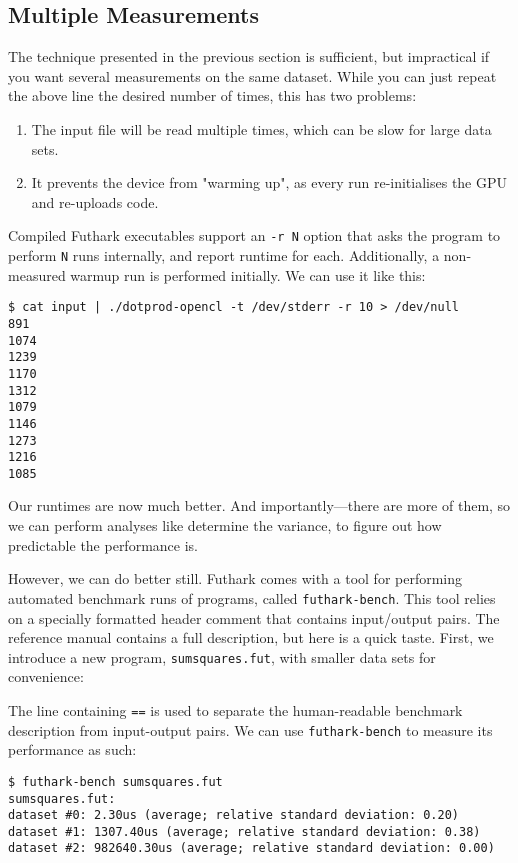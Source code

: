\documentclass[oneside,11pt]{book}
\newenvironment{wrap}{\vspace{\topskip}\par\noindent\begin{minipage}{\linewidth}}{\end{minipage}\par}
\newcommand{\inplisting}[1]{\begin{wrap}\end{wrap}}
\begin{document}
\subsection{Multiple Measurements}

The technique presented in the previous section is sufficient, but
impractical if you want several measurements on the same dataset.
While you can just repeat the above line the desired number of times,
this has two problems:

\begin{enumerate}
\item The input file will be read multiple times, which can be slow
  for large data sets.
\item It prevents the device from "warming up", as every run
  re-initialises the GPU and re-uploads code.
\end{enumerate}

Compiled Futhark executables support an \texttt{-r N} option that asks
the program to perform \texttt{N} runs internally, and report runtime
for each.  Additionally, a non-measured warmup run is performed
initially.  We can use it like this:

\begin{verbatim}
$ cat input | ./dotprod-opencl -t /dev/stderr -r 10 > /dev/null
891
1074
1239
1170
1312
1079
1146
1273
1216
1085
\end{verbatim}

Our runtimes are now much better.  And importantly---there are
more of them, so we can perform analyses like determine the variance,
to figure out how predictable the performance is.

However, we can do better still.  Futhark comes with a tool for
performing automated benchmark runs of programs, called
\texttt{futhark-bench}.  This tool relies on a specially formatted
header comment that contains input/output pairs.  The reference manual
contains a full description, but here is a quick taste.  First, we
introduce a new program, \texttt{sumsquares.fut}, with smaller data
sets for convenience:

\inplisting{src/sumsquares.fut}

The line containing \texttt{==} is used to separate the human-readable
benchmark description from input-output pairs.  We can use
\texttt{futhark-bench} to measure its performance as such:

\begin{verbatim}
$ futhark-bench sumsquares.fut
sumsquares.fut:
dataset #0: 2.30us (average; relative standard deviation: 0.20)
dataset #1: 1307.40us (average; relative standard deviation: 0.38)
dataset #2: 982640.30us (average; relative standard deviation: 0.00)
\end{verbatim}
\end{document}
